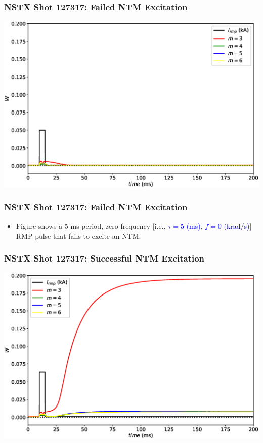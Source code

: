 \documentclass{beamer}
\newcommand{\blue}[1]{\textcolor{blue}{#1}}
\begin{document}
\begin{frame}
\frametitle{NSTX Shot 127317: Failed NTM Excitation}
\begin{center}
\includegraphics[width=\textwidth]{Waveform0.eps}
\end{center}

\end{frame}

\begin{frame}
\frametitle{NSTX Shot 127317: Failed NTM Excitation}
\begin{itemize}
\item Figure shows a 5 ms period, zero frequency [i.e., \blue{$\tau=5$ (ms)}, \blue{$f= 0$ (krad/s)}] RMP
pulse that  fails to excite an NTM. 
\end{itemize}
\end{frame}

\begin{frame}
\frametitle{NSTX Shot 127317: Successful  NTM Excitation}
\begin{center}
\includegraphics[width=\textwidth]{Waveform1.eps}
\end{center}

\end{frame}
\end{document}
